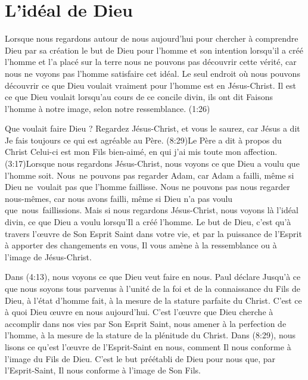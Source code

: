 \section{L'id\'eal de Dieu}

Lorsque nous regardons autour de nous aujourd'hui pour
 chercher à comprendre Dieu par sa création
 \ocadr le but de Dieu pour l'homme et son intention
 lorsqu'il a créé l'homme et l'a placé sur la terre \fcadr{}
 nous ne pouvons pas découvrir cette vérité,
 car nous ne voyons pas l'homme satisfaire cet idéal.
 Le seul endroit où nous pouvons découvrir ce que Dieu voulait vraiment
 pour l'homme est en Jésus-Christ.
 Il est ce que Dieu voulait lorsqu'au cours de ce concile divin, ils ont dit\frcolon{}
 \Og Faisons l'homme à notre image, selon notre ressemblance. \Fg{}
 (1:26)

Que voulait faire Dieu ?
 Regardez Jésus-Christ, et vous le saurez, car Jésus a dit\frcolon{}
 \Og Je fais toujours ce qui est agréable au Père. \Fg{}
 (8:29)Le Père a dit à propos du Christ\frcolon{}
 \Og Celui-ci est mon Fils bien-aimé, en qui j'ai mis toute mon affection. \Fg{}
 (3:17)Lorsque nous regardons Jésus-Christ,
 nous voyons ce que Dieu a voulu que l'homme soit.
 Nous~ne pouvons pas regarder Adam, car Adam a failli,
 même si Dieu ne~voulait pas que l'homme faillisse.
 Nous ne pouvons pas nous regarder nous-mêmes,
 car nous avons failli, même si Dieu n'a pas voulu que~nous~faillissions.
 Mais si nous regardons Jésus-Christ, nous voyons là l'idéal divin,
 ce que Dieu a voulu lorsqu'Il a créé l'homme.
 Le but de Dieu, c'est qu'à travers l'œuvre de Son Esprit Saint dans votre vie,
 et par la puissance de l'Esprit à apporter des changements en vous,
 Il vous amène à la ressemblance ou à l'image de Jésus-Christ.

Dans (4:13), nous voyons ce que Dieu veut faire en nous.
 Paul déclare\frcolon{}
 \Og Jusqu'à ce que nous soyons tous parvenus à l'unité de la foi
 et de la connaissance du Fils de Dieu, à l'état d'homme fait,
 à la mesure de la stature parfaite du Christ. \Fg{}
 C'est ce à quoi Dieu œuvre en nous aujourd'hui.
 C'est l'œuvre que Dieu cherche à accomplir dans nos vies
 par Son Esprit Saint, nous amener à la perfection de l'homme,
 à la mesure de la stature de la plénitude du Christ.
 Dans (8:29), nous lisons
 ce qu'est l'œuvre de l'Esprit-Saint en nous,
 comment Il nous conforme à l'image du Fils de Dieu.
 C'est le but préétabli de Dieu pour nous
 que, par l'Esprit-Saint, Il nous conforme à l'image de Son Fils.



